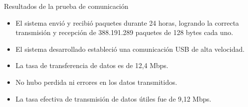 \begin{frame}{Resultados de la prueba de comunicación}
	\begin{itemize}
		\item El sistema envió y recibió paquetes durante 24 horas, logrando la correcta transmisión y recepción de 388.191.289 paquetes de 128 bytes cada uno.
		\item El sistema desarrollado estableció una comunicación USB de alta velocidad.
		\item La tasa de transferencia de datos es de 12,4 Mbps.
		\item No hubo perdida ni errores en los datos transmitidos.
		\item La tasa efectiva de transmisión de datos útiles fue de 9,12 Mbps.
	\end{itemize}
\end{frame}